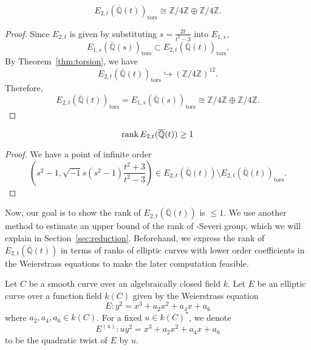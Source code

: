 \documentclass[main]{subfiles}
\begin{document}
\begin{lem}
    \begin{equation*}
        E_{2,t}(\overline{\mathbb{Q}}(t))_{\text{tors}} \cong \mathbb{Z} / 4 \mathbb{Z} \oplus \mathbb{Z} / 4 \mathbb{Z}.
    \end{equation*}
\end{lem}
\begin{proof}
    Since $E_{2,t}$ is given by substituting $s = \frac{2t}{t^{2} - 3}$ into $E_{1,s}$,
    \begin{equation*}
        E_{1,s}(\overline{\mathbb{Q}}(s))_{\text{tors}} \subset E_{2,t}(\overline{\mathbb{Q}}(t))_{\text{tors}}.
    \end{equation*}
    By Theorem~\ref{thm:torsion}, we have
    \begin{equation*}
        E_{2,t}(\overline{\mathbb{Q}}(t))_{\text{tors}} \hookrightarrow (\mathbb{Z} / 4 \mathbb{Z})^{12}.
    \end{equation*}
    Therefore,
    \begin{equation*}
        E_{2,t}(\overline{\mathbb{Q}}(t))_{\text{tors}} = E_{1,s}(\overline{\mathbb{Q}}(s))_{\text{tors}} \cong \mathbb{Z} / 4 \mathbb{Z} \oplus \mathbb{Z} / 4 \mathbb{Z}.
    \end{equation*}
\end{proof}

\begin{lem}
    \begin{equation*}
        \operatorname{rank} E_{2,t}(\overline{\mathbb{Q}}(t)) \geq 1
    \end{equation*}
\end{lem}
\begin{proof}
    We have a point of infinite order
    \begin{equation*}
        \left(s^{2} - 1, \sqrt{-1} s(s^{2} - 1) \frac{t^{2} + 3}{t^{2} - 3} \right) \in E_{2,t}(\overline{\mathbb{Q}}(t)) \setminus E_{2,t}(\overline{\mathbb{Q}}(t))_{\text{tors}}.
    \end{equation*}
\end{proof}
Now, our goal is to show the rank of $E_{2,t}(\overline{\mathbb{Q}}(t))$ is $\leq 1$.
We use another method to estimate an upper bound of the rank of \Neron-Severi group, which we will explain in Section~\ref{sec:reduction}.
Beforehand, we express the rank of $E_{2,t}(\overline{\mathbb{Q}}(t))$ in terms of ranks of elliptic curves with lower order coefficients in the Weierstrass equations to make the later computation feasible.

\begin{dfn}
    Let $C$ be a smooth curve over an algebraically closed field $k$.
    Let $E$ be an elliptic curve over a function field $k(C)$ given by the Weierstrass equation
    \begin{equation*}
        E: y^{2} = x^{3} + a_{2} x^{2} + a_{4} x + a_{6}
    \end{equation*}
    where $a_{2}, a_{4}, a_{6} \in k(C)$.
    For a fixed $u \in k(C)^*$, we denote
    \begin{equation*}
        E^{(u)}: u y^{2} = x^{3} + a_{2} x^{2} + a_{4} x + a_{6}
    \end{equation*}
    to be the quadratic twist of $E$ by $u$.
\end{dfn}
\end{document}
